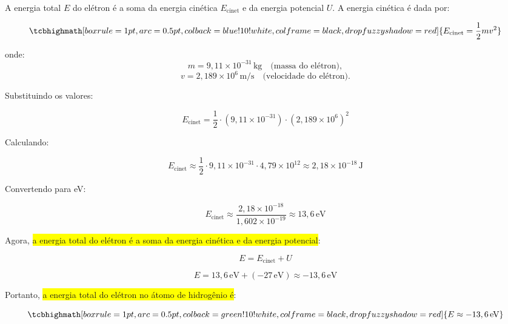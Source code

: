 \documentclass[a4paper,12pt]{article}
\begin{document}
\begin{flushleft}
A energia total \( E \) do elétron é a soma da energia cinética \( E_{\text{cinet}} \) e da energia potencial \( U \). A energia cinética é dada por:

\begin{equation}
    \tcbhighmath[boxrule=1pt,arc=0.5pt,colback=blue!10!white,colframe=black,
      drop fuzzy shadow=red]{E_{\text{cinet}} = \frac{1}{2} m v^2}
\end{equation}

onde:
\begin{equation}
m = 9,11 \times 10^{-31} \, \text{kg} \quad \text{(massa do elétron)},
\end{equation}
\begin{equation}
v = 2,189 \times 10^6 \, \text{m/s} \quad \text{(velocidade do elétron)}.
\end{equation}

Substituindo os valores:

\begin{equation}
E_{\text{cinet}} = \frac{1}{2} \cdot (9,11 \times 10^{-31}) \cdot (2,189 \times 10^6)^2
\end{equation}

Calculando:

\begin{equation}
E_{\text{cinet}} \approx \frac{1}{2} \cdot 9,11 \times 10^{-31} \cdot 4,79 \times 10^{12} \approx 2,18 \times 10^{-18} \, \text{J}
\end{equation}

Convertendo para eV:

\begin{equation}
E_{\text{cinet}} \approx \frac{2,18 \times 10^{-18}}{1,602 \times 10^{-19}} \approx 13,6 \, \text{eV}
\end{equation}

Agora, \colorbox{yellow}{a energia total do elétron é a soma da energia cinética e da energia potencial}:

\begin{equation}
E = E_{\text{cinet}} + U
\end{equation}

\begin{equation}
E = 13,6 \, \text{eV} + (-27 \, \text{eV}) \approx -13,6 \, \text{eV}
\end{equation}

Portanto, \colorbox{yellow}{a energia total do elétron no átomo de hidrogênio é}:

\begin{equation}
    \tcbhighmath[boxrule=1pt,arc=0.5pt,colback=green!10!white,colframe=black,
      drop fuzzy shadow=red]{E \approx -13,6 \, \text{eV}}
\end{equation}
\end{flushleft}
\end{document}
